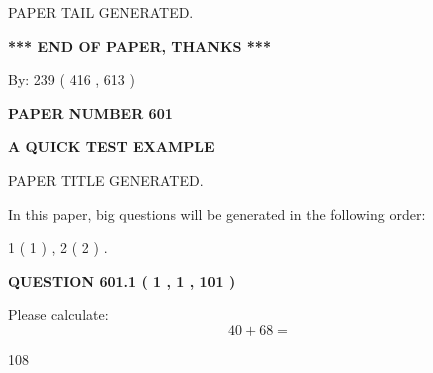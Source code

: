 \documentclass[12pt]{article}
\begin{document}
\vspace{2.0in} PAPER TAIL GENERATED.
   
   
   
   
\vspace{1.0in} 
{\textbf{\large{ *** END OF PAPER, THANKS *** }}} 
   
   
\hspace{1.0in} By: 
 239 ( 416 ,  613 )
   
   
   
   
\newpage 
\setcounter{page}{ 
   601001 } 
   
   
   
   
 {\textbf{ \Large{ PAPER NUMBER  601  }}}
   
   
\vspace{0.2in}
   
   
   
   
   
   
   
   
 \vspace{0.2in}
{\LARGE {\textbf{ A QUICK TEST EXAMPLE}}}
   
   
 PAPER TITLE GENERATED.
   
   
   
\vspace{0.2in}
   
In this paper, big questions will be generated in the following order: 
   
   
   1 ( 1 )
 ,
   2 ( 2 )
 .
  
\vspace{0.2in}
  
{\textbf{\Large{QUESTION
601.1 
 ( 1 , 1 , 101 )
}}}
  
  
 
Please calculate:
\begin{equation}
40 +  %
68 = \nonumber
\end{equation}
 
 
 
\noindent{}
 
 

108
 
 
\noindent{}
 
 

 
 
\end{document}
